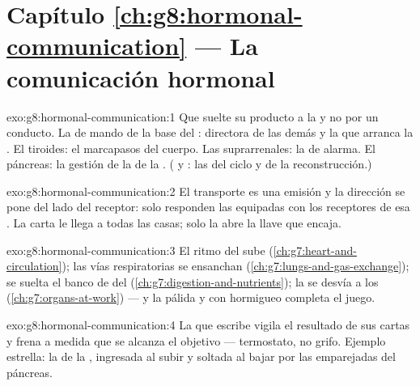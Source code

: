 \section*{Capítulo \ref{ch:g8:hormonal-communication} --- La comunicación hormonal}

\begin{solution}{exo:g8:hormonal-communication:1}
Que suelte su producto a la  y no por un conducto. La  de
mando de la base del : directora de las demás y la que arranca
la . El tiroides: el marcapasos del cuerpo. Las suprarrenales:
la  de alarma. El páncreas: la gestión de la  de la
. ( y : las  del ciclo y de la
reconstrucción.)
\end{solution}

\begin{solution}{exo:g8:hormonal-communication:2}
El transporte es una emisión y la dirección se pone del lado del
receptor: solo responden las  equipadas con los receptores de
esa . La carta le llega a todas las casas; solo la abre la llave
que encaja.
\end{solution}

\begin{solution}{exo:g8:hormonal-communication:3}
El ritmo del  sube (\cref{ch:g7:heart-and-circulation}); las
vías respiratorias se ensanchan
(\cref{ch:g7:lungs-and-gas-exchange}); se suelta el banco de 
del  (\cref{ch:g7:digestion-and-nutrients}); la  se desvía
a los  (\cref{ch:g7:organs-at-work}) --- y la  pálida y con
hormigueo completa el juego.
\end{solution}

\begin{solution}{exo:g8:hormonal-communication:4}
La  que escribe vigila el resultado de sus cartas y frena a
medida que se alcanza el objetivo --- termostato, no grifo. Ejemplo
estrella: la  de la , ingresada al subir y soltada al
bajar por las  emparejadas del páncreas.
\end{solution}

